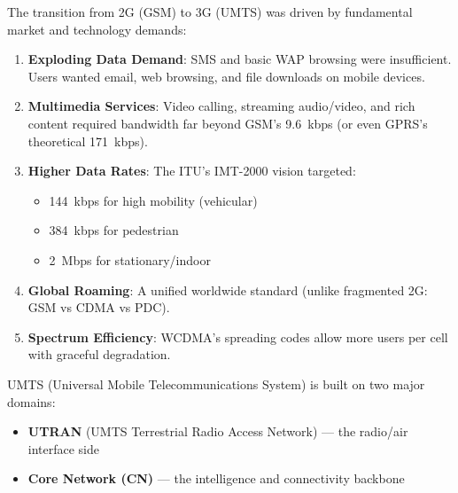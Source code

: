 

\CNchained{}

The transition from 2G (GSM) to 3G (UMTS) was driven by fundamental market and technology demands:

\begin{enumerate}
\def\labelenumi{\arabic{enumi}.}
\tightlist
\item
  \textbf{Exploding Data Demand}: SMS and basic WAP browsing were insufficient. Users wanted email, web browsing, and file downloads on mobile devices.
\item
  \textbf{Multimedia Services}: Video calling, streaming audio/\allowbreak{}video, and rich content required bandwidth far beyond GSM’s 9.6~kbps (or even GPRS’s theoretical 171~kbps).
\item
  \textbf{Higher Data Rates}: The ITU’s IMT-2000 vision targeted:

  \begin{itemize}
  \tightlist
  \item
    144~kbps for high mobility (vehicular)
  \item
    384~kbps for pedestrian
  \item
    2~Mbps for stationary/\allowbreak{}indoor
  \end{itemize}
\item
  \textbf{Global Roaming}: A unified worldwide standard (unlike fragmented 2G: GSM vs CDMA vs PDC).
\item
  \textbf{Spectrum Efficiency}: WCDMA’s spreading codes allow more users per cell with graceful degradation.
\end{enumerate}





UMTS (Universal Mobile Telecommunications System) is built on two major domains:

\begin{itemize}
\tightlist
\item
  \textbf{UTRAN} (UMTS Terrestrial Radio Access Network) — the radio/\allowbreak{}air interface side
\item
  \textbf{Core Network (CN)} — the intelligence and connectivity backbone
\end{itemize}

